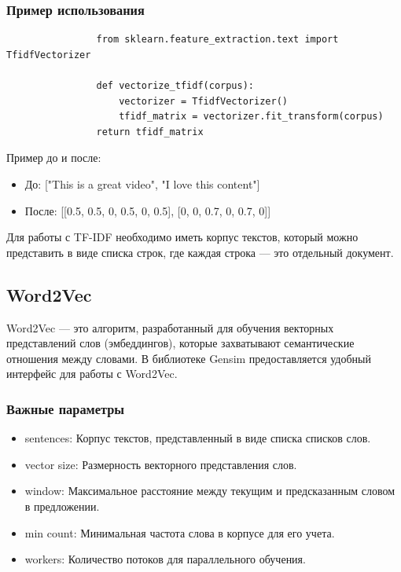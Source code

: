 		
		\subsubsection{Пример использования}
			\begin{verbatim}
				from sklearn.feature_extraction.text import TfidfVectorizer
	
				def vectorize_tfidf(corpus):
					vectorizer = TfidfVectorizer()
					tfidf_matrix = vectorizer.fit_transform(corpus)
				return tfidf_matrix
			\end{verbatim}

			Пример до и после:
			\begin{itemize}
				\item До: ["This is a great video", "I love this content"]
				\item После: [[0.5, 0.5, 0, 0.5, 0, 0.5], [0, 0, 0.7, 0, 0.7, 0]]
			\end{itemize}
			
			Для работы с TF-IDF необходимо иметь корпус текстов, который можно представить в виде списка строк, где каждая строка — это отдельный документ.
			
 
	\subsection{Word2Vec}
 		Word2Vec — это алгоритм, разработанный для обучения векторных представлений слов (эмбеддингов), которые захватывают семантические отношения между словами. В библиотеке Gensim предоставляется удобный интерфейс для работы с Word2Vec.
		
		\subsubsection{Важные параметры}	
			\begin{itemize}
				\item sentences: Корпус текстов, представленный в виде списка списков слов.
				\item vector size: Размерность векторного представления слов.
				\item window: Максимальное расстояние между текущим и предсказанным словом в предложении.
				\item min count: Минимальная частота слова в корпусе для его учета.
				\item workers: Количество потоков для параллельного обучения.
			\end{itemize}
		
